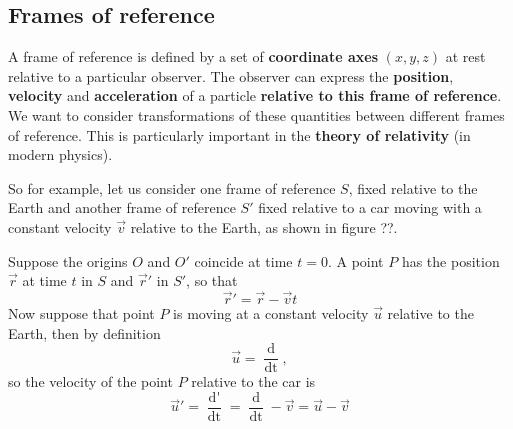 \subsection{Frames of reference}

A frame of reference is defined by a set of \textbf{coordinate axes} $(x, y, z)$ at rest relative to a particular observer. The observer can express the \textbf{position}, \textbf{velocity} and \textbf{acceleration} of a particle \textbf{relative to this frame of reference}. We want to consider transformations of these quantities between different frames of reference. This is particularly important in the \textbf{theory of relativity} (in modern physics). 

So for example, let us consider one frame of reference $S$, fixed relative to the Earth and another frame of reference $S'$ fixed relative to a car moving with a constant velocity $\vec{v}$ relative to the Earth, as shown in figure ??. 


Suppose the origins $O$ and $O'$ coincide at time $t = 0$. A point $P$ has the position $\vec{r}$ at time $t$ in $S$ and $\vec{r}'$ in $S'$, so that
\begin{equation*}
    \vec{r}' = \vec{r} - \vec{v}t 
\end{equation*}
Now suppose that point $P$ is moving at a constant velocity $\vec{u}$ relative to the Earth, then by definition
\begin{equation*}
    \vec{u} = \frac{\mathop{\mathrm{d}\vec{r}}}{\mathop{\mathrm{d}t}},
\end{equation*}
so the velocity of the point $P$ relative to the car is 
\begin{equation*}
    \vec{u}' = \frac{\mathop{\mathrm{d}\vec{r}'}}{\mathop{\mathrm{d}t}} = \frac{\mathop{\mathrm{d}\vec{r}}}{\mathop{\mathrm{d}t}} - \vec{v} = \vec{u} - \vec{v}
\end{equation*}

    
